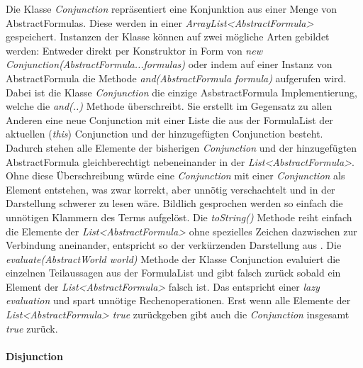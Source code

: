 \documentclass[12pt,a4paper]{article}
\begin{document}
Die Klasse \textit{Conjunction} repräsentiert eine Konjunktion aus einer Menge von AbstractFormulas. Diese werden in einer \textit{ArrayList<AbstractFormula>} gespeichert. Instanzen der Klasse können auf zwei mögliche Arten gebildet werden: Entweder direkt per Konstruktor in Form von \textit{new Conjunction(AbstractFormula...formulas)} oder indem auf einer Instanz von AbstractFormula die Methode \textit{and(AbstractFormula formula)} aufgerufen wird. Dabei ist die Klasse \textit{Conjunction} die einzige AsbstractFormula Implementierung, welche die \textit{and(..)} Methode überschreibt. Sie erstellt im Gegensatz zu allen Anderen eine neue Conjunction mit einer Liste die aus der FormulaList der aktuellen (\textit{this}) Conjunction und der hinzugefügten Conjunction besteht. Dadurch stehen alle Elemente der bisherigen \textit{Conjunction} und der hinzugefügten AbstractFormula gleichberechtigt nebeneinander in der \textit{List<AbstractFormula>}. Ohne diese Überschreibung würde eine \textit{Conjunction} mit einer \textit{Conjunction} als Element entstehen, was zwar korrekt, aber unnötig verschachtelt und in der Darstellung schwerer zu lesen wäre. Bildlich gesprochen werden so einfach die unnötigen Klammern des Terms aufgelöst. Die \textit{toString()} Methode reiht einfach die Elemente der \textit{List<AbstractFormula>} ohne spezielles Zeichen dazwischen zur Verbindung aneinander, entspricht so der verkürzenden Darstellung aus \cite{beierle19}. Die \textit{evaluate(AbstractWorld world)} Methode der Klasse Conjunction evaluiert die einzelnen Teilaussagen aus der FormulaList und gibt falsch zurück sobald ein Element der \textit{List<AbstractFormula>} falsch ist. Das entspricht einer \textit{lazy evaluation} und spart unnötige Rechenoperationen. Erst wenn alle Elemente der \textit{List<AbstractFormula>} \textit {true} zurückgeben gibt auch die \textit{Conjunction} insgesamt \textit{true} zurück.


\paragraph{Disjunction} \mbox{}
\end{document}
